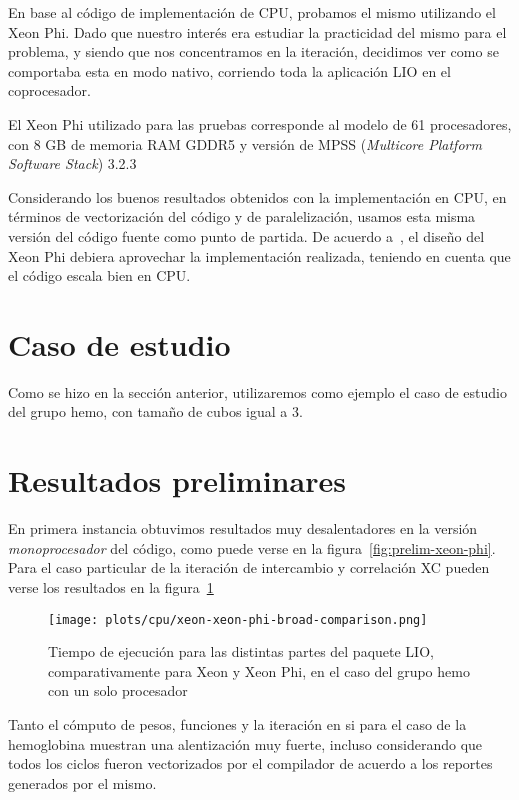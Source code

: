 En base al c\'odigo de implementaci\'on de CPU, probamos el mismo
utilizando el Xeon Phi. Dado que nuestro inter\'es era estudiar la
practicidad del mismo para el problema, y siendo que nos concentramos
en la iteraci\'on, decidimos ver como se comportaba esta en modo
nativo, corriendo toda la aplicaci\'on LIO en el coprocesador.

El Xeon Phi utilizado para las pruebas corresponde al modelo de
61 procesadores, con 8 GB de memoria RAM GDDR5 y versi\'on de MPSS
(\textit{Multicore Platform Software Stack}) 3.2.3

Considerando los buenos resultados obtenidos con la implementaci\'on
en CPU, en t\'erminos de vectorizaci\'on del c\'odigo y de paralelizaci\'on,
usamos esta misma versi\'on del c\'odigo fuente como punto de partida. De
acuerdo a~\cite{Jeffers}, el dise\~no del Xeon Phi debiera aprovechar la
implementaci\'on realizada, teniendo en cuenta que el c\'odigo escala bien
en CPU.

\section{Caso de estudio}

Como se hizo en la secci\'on anterior, utilizaremos como ejemplo el caso de
estudio del grupo hemo, con tama\~no de cubos igual a 3.

\section{Resultados preliminares}

En primera instancia obtuvimos resultados muy desalentadores en la versi\'on
\textit{monoprocesador} del c\'odigo, como puede verse en la figura~\ref{fig:prelim-xeon-phi}.
Para el caso particular de la iteraci\'on de intercambio y correlaci\'on XC pueden
verse los resultados en la figura~\ref{fig:prelim-xeon-phi-xc}

\begin{figure}[htbp]
   \centering
   \texttt{[image: plots/cpu/xeon-xeon-phi-broad-comparison.png]}
   \caption{Tiempo de ejecuci\'on para las distintas partes del paquete LIO,
   comparativamente para Xeon y Xeon Phi, en el caso del grupo hemo con un solo procesador}
   \label{fig:prelim-xeon-phi-xc}
\end{figure}

Tanto el c\'omputo de pesos, funciones y la iteraci\'on en si para el caso de la
hemoglobina muestran una alentizaci\'on muy fuerte, incluso considerando que
todos los ciclos fueron vectorizados por el compilador de acuerdo a los reportes
generados por el mismo.

